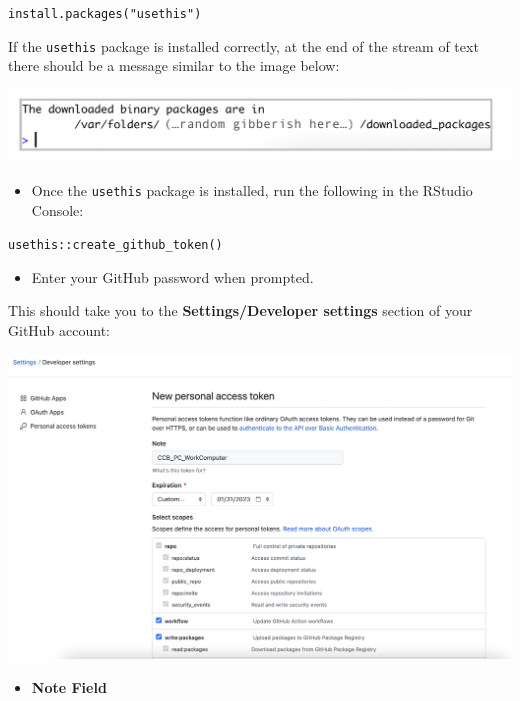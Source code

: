\documentclass[
]{book}
\providecommand{\tightlist}{%
  \setlength{\itemsep}{0pt}\setlength{\parskip}{0pt}}
\begin{document}
\texttt{install.packages("usethis")}

If the \texttt{usethis} package is installed correctly, at the end of the stream of text there should be a message similar to the image below:

\begin{flushleft}\includegraphics{images/usethis} \end{flushleft}

\begin{itemize}
\tightlist
\item
  Once the \texttt{usethis} package is installed, run the following in the RStudio Console:
\end{itemize}

\texttt{usethis::create\_github\_token()}

\begin{itemize}
\tightlist
\item
  Enter your GitHub password when prompted.
\end{itemize}

This should take you to the \textbf{Settings/Developer settings} section of your GitHub account:

\begin{flushleft}\includegraphics{images/pat} \end{flushleft}

\begin{itemize}
\tightlist
\item
  \textbf{Note Field}
\end{itemize}
\end{document}

